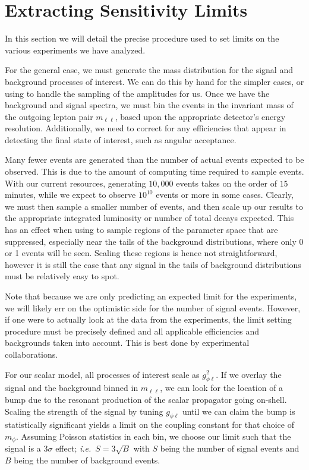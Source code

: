 \section{Extracting Sensitivity Limits}
\label{sec:limit_procedure}
In this section we will detail the precise procedure used to set limits on the various experiments we have analyzed.

For the general case, we must generate the mass distribution for the signal and background processes of interest.
We can do this by hand for the simpler cases, or using \madgraph to handle the sampling of the amplitudes for us.
Once we have the background and signal spectra, we must bin the events in the invariant mass of the outgoing lepton pair $m_{\ell\ell}$, based upon the appropriate detector's energy resolution.
Additionally, we need to correct for any efficiencies that appear in detecting the final state of interest, such as angular acceptance.

Many fewer events are generated than the number of actual events expected to be observed.
This is due to the amount of computing time required to sample events.
With our current resources, generating $10,000$ events takes on the order of $15$ minutes, while we expect to observe $10^{10}$ events or more in some cases.
Clearly, we must then sample a smaller number of events, and then scale up our results to the appropriate integrated luminosity or number of total decays expected.
This has an effect when using \madgraph to sample regions of the parameter space that are suppressed, especially near the tails of the background distributions, where only 0 or 1 events will be seen.
Scaling these regions is hence not straightforward, however it is still the case that any signal in the tails of background distributions must be relatively easy to spot.

Note that because we are only predicting an expected limit for the experiments, we will likely err on the optimistic side for the number of signal events.
However, if one were to actually look at the data from the experiments, the limit setting procedure must be precisely defined and all applicable efficiencies and backgrounds taken into account.
This is best done by experimental collaborations.

For our scalar model, all processes of interest scale as $g_{\phi\ell}^2$.
If we overlay the signal and the background binned in $m_{\ell\ell}$, we can look for the location of a bump due to the resonant production of the scalar propagator going on-shell.
Scaling the strength of the signal by tuning $g_{\phi\ell}$ until we can claim the bump is statistically significant yields a limit on the coupling constant for that choice of $m_\phi$.
Assuming Poisson statistics in each bin, we choose our limit such that the signal is a $3\sigma$ effect; {\em i.e.}\ $S = 3\sqrt{B}$ with $S$ being the number of signal events and $B$ being the number of background events.


